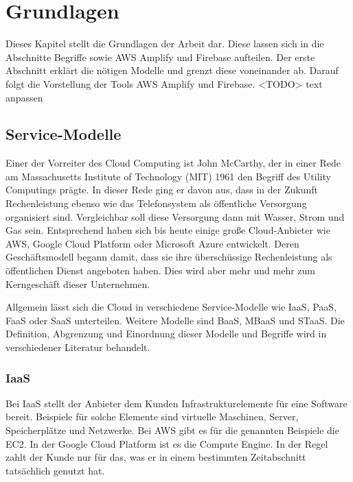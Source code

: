 \chapter{Grundlagen}

Dieses Kapitel stellt die Grundlagen der Arbeit dar. Diese lassen sich in die Abschnitte Begriffe sowie \ac{AWS} Amplify und Firebase aufteilen. Der erste Abschnitt erklärt die nötigen Modelle und grenzt diese voneinander ab. Darauf folgt die Vorstellung der Tools \ac{AWS} Amplify und Firebase. <TODO> text anpassen

\section{Service-Modelle}

Einer der Vorreiter des Cloud Computing ist John McCarthy, der in einer Rede am Massachusetts Institute of Technology (MIT) 1961 den Begriff des Utility Computings prägte. In dieser Rede ging er davon aus, dass in der Zukunft Rechenleistung ebenso wie das Telefonsystem als öffentliche Versorgung organisiert sind. Vergleichbar soll diese Versorgung dann mit Wasser, Strom und Gas sein. Entsprechend haben sich bis heute einige große Cloud-Anbieter wie \ac{AWS}, Google Cloud Platform oder Microsoft Azure entwickelt. Deren Geschäftsmodell begann damit, dass sie ihre überschüssige Rechenleistung als öffentlichen Dienst angeboten haben. Dies wird aber mehr und mehr zum Kerngeschäft dieser Unternehmen. \autocite{buyya2013mastering}

Allgemein lässt sich die Cloud in verschiedene Service-Modelle wie \ac{IaaS}, \ac{PaaS}, \ac{FaaS} oder \ac{SaaS} unterteilen. Weitere Modelle sind \ac{BaaS}, \ac{MBaaS} und \ac{STaaS}. Die Definition, Abgrenzung und Einordnung dieser Modelle und Begriffe wird in verschiedener Literatur \autocite{jiang2020overview} \autocite{kumar2019serverless} \autocite{dahunsi2021commercial} behandelt.

\subsection{\acl{IaaS}}

Bei \acf{IaaS} stellt der Anbieter dem Kunden Infrastrukturelemente für eine Software bereit. Beispiele für solche Elemente sind virtuelle Maschinen, Server, Speicherplätze und Netzwerke. Bei \ac{AWS} gibt es für die genannten Beispiele die \ac{EC2}. In der Google Cloud Platform ist es die Compute Engine. In der Regel zahlt der Kunde nur für das, was er in einem bestimmten Zeitabschnitt tatsächlich genutzt hat.

